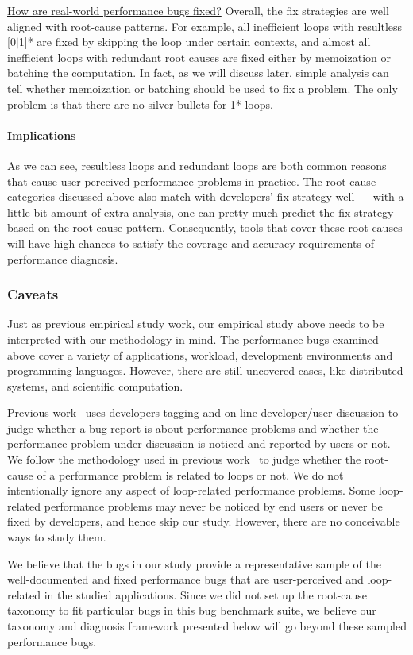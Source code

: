 \underline{How are real-world performance bugs fixed?}
Overall, the fix strategies are well aligned with root-cause patterns.
For example, 
all inefficient loops with resultless [0$|$1]* are
fixed by skipping the loop under certain contexts,
and almost all inefficient loops with redundant root causes are fixed either by 
memoization or batching the computation. 
In fact, as we will discuss later, simple analysis can tell whether 
memoization or batching should be used to fix a problem.
The only problem is that there are no silver bullets for 1* loops.

\paragraph{Implications}
As we can see, resultless loops and redundant loops are both common reasons
that cause user-perceived performance problems in practice. The root-cause
categories discussed above also match with developers' fix strategy well ---
with a little bit amount of extra analysis, one can pretty much predict the fix strategy based on the root-cause pattern.
Consequently, tools that cover these root causes will have high
chances to satisfy the coverage and accuracy requirements of performance 
diagnosis.


\subsubsection{Caveats} 
Just as previous empirical study work, 
our empirical study above needs to be interpreted with our methodology in mind. 
The performance bugs examined above cover a variety of applications, workload, 
development environments and programming languages. 
However, there are still uncovered cases, like distributed systems, 
and scientific computation. 

Previous work~\cite{PerfBug, SongOOPSLA2014} uses developers tagging and
on-line developer/user discussion to judge whether a bug report is about
performance problems and whether 
the performance problem under discussion is noticed and reported by users
or not.
We follow the methodology used in previous work~\cite{SongOOPSLA2014} to judge 
whether the root-cause of a performance problem is related to loops or not.
We do not intentionally ignore any aspect of loop-related performance problems. 
Some loop-related performance problems may never be noticed by end users
or never be fixed by developers, and hence skip our study. However,
there are no conceivable ways to study them. 

We believe that the bugs in our study provide a representative sample of the 
well-documented and
fixed performance bugs that are user-perceived and loop-related in the studied 
applications. 
Since we did not set up the root-cause taxonomy to fit particular
bugs in this bug benchmark suite, we believe our taxonomy and diagnosis
framework presented below will go beyond these sampled performance bugs. 

